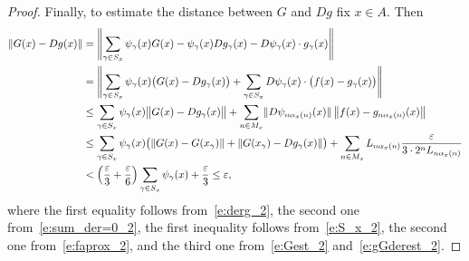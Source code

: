 \documentclass[a4paper,twoside,10pt,reqno,draft]{amsart}
\theoremstyle{definition}
\theoremstyle{remark}
\newcommand\norm[1]{\mathopen\|#1\mathclose\|}
\newcommand\norma[1]{\left\|#1\right\|}
\newcommand\normb[2]{\csname#1l\endcsname\|#2\csname#1r\endcsname\|}
\newcommand\al{\alpha}
\newcommand\ga{\gamma}
\newcommand\ve{\varepsilon}
\begin{document}
\begin{proof}
Finally, to estimate the distance between $G$ and $Dg$ fix $x\in A$.
Then
\[\begin{split}
\norm{G(x)-Dg(x)}&=\normb{Bigg}{\sum_{\ga\in S_x}\psi_\ga(x)G(x)-\psi_\ga(x)Dg_\ga(x)-D\psi_\ga(x)\cdot g_\ga(x)}\\
&=\normb{Bigg}{\sum_{\ga\in S_x}\psi_\ga(x)\bigl(G(x)-Dg_\ga(x)\bigr)+\sum_{\ga\in S_x}D\psi_\ga(x)\cdot\bigl(f(x)-g_\ga(x)\bigr)}\\
&\le\sum_{\ga\in S_x}\psi_\ga(x)\normb{big}{G(x)-Dg_\ga(x)}+\sum_{n\in M_x}\norm{D\psi_{n\al_x(n)}(x)}\norma{f(x)-g_{n\al_x(n)}(x)}\\
&\le\sum_{\ga\in S_x}\psi_\ga(x)\bigl(\norm{G(x)-G(x_\ga)}+\norm{G(x_\ga)-Dg_\ga(x)}\bigr)+\sum_{n\in M_x}L_{n\al_x(n)}\frac\ve{3\cdot2^nL_{n\al_x(n)}}\\
&<\left(\frac\ve3+\frac\ve6\right)\sum_{\ga\in S_x}\psi_\ga(x)+\frac\ve3\le\ve,
\end{split}\]
where the first equality follows from~\eqref{e:derg_2}, the second one from~\eqref{e:sum_der=0_2},
the first inequality follows from~\eqref{e:S_x_2}, the second one from~\eqref{e:faprox_2}, and the third one from~\eqref{e:Gest_2} and~\eqref{e:gGderest_2}.
\fi
\end{proof}
\end{document}
